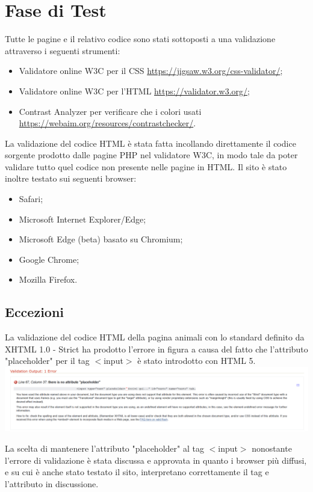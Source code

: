 \section{Fase di Test}
Tutte le pagine e il relativo codice sono stati sottoposti a una validazione attraverso i seguenti strumenti:
    \begin{itemize}
        \item Validatore online W3C per il CSS \url{https://jigsaw.w3.org/css-validator/};
        \item Validatore online W3C per l'HTML \url{https://validator.w3.org/};
        \item Contrast Analyzer per verificare che i colori usati \url{https://webaim.org/resources/contrastchecker/}.
    \end{itemize}
    La validazione del codice HTML è stata fatta incollando direttamente il codice sorgente prodotto dalle pagine PHP nel validatore W3C, in modo tale da poter validare tutto quel codice non presente nelle pagine in HTML.
    Il sito è stato inoltre testato sui seguenti browser:
    \begin{itemize}
        \item Safari;
        \item Microsoft Internet Explorer/Edge;
        \item Microsoft Edge (beta) basato su Chromium;
        \item Google Chrome;
        \item Mozilla Firefox.
    \end{itemize}

	\subsection{Eccezioni}
	La validazione del codice HTML della pagina animali con lo standard definito da XHTML 1.0 - Strict ha prodotto l'errore in figura a causa del fatto che l'attributo "placeholder" per il tag $<$input$>$ è stato introdotto con HTML 5.\\
	
	\includegraphics[width=35pc]{./img/erroreValidazione.png}
	
	La scelta di mantenere l'attributo "placeholder" al tag $<$input$>$ nonostante l'errore di validazione è stata discussa e approvata in quanto i browser più diffusi, e su cui è anche stato testato il sito, interpretano correttamente il tag e l'attributo in discussione.
\pagebreak